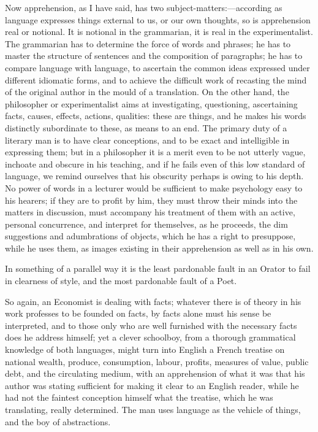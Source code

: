 Now apprehension, as I have said, has two subject-matters:—according
as language expresses things external to us, or our own thoughts, so
is apprehension real or notional. It is notional in the grammarian, it
is real in the experimentalist. The grammarian has to determine the
force of words and phrases; he has to master the structure of
sentences and the composition of paragraphs; he has to compare
language with language, to ascertain the common ideas expressed under
different idiomatic forms, and to achieve the difficult work of
recasting the mind of the original author in the mould of a
translation. On the other hand, the philosopher or experimentalist
aims at investigating, questioning, ascertaining facts, causes,
effects, actions, qualities: these are things, and he makes his words
distinctly subordinate to these, as means to an end. The primary duty
of a literary man is to have clear conceptions, and to be exact
and intelligible in expressing them; but in a philosopher it is a
merit even to be not utterly vague, inchoate and obscure in his
teaching, and if he fails even of this low standard of language, we
remind ourselves that his obscurity perhaps is owing to his depth. No
power of words in a lecturer would be sufficient to make psychology
easy to his hearers; if they are to profit by him, they must throw
their minds into the matters in discussion, must accompany his
treatment of them with an active, personal concurrence, and interpret
for themselves, as he proceeds, the dim suggestions and adumbrations
of objects, which he has a right to presuppose, while he uses them, as
images existing in their apprehension as well as in his own.

In something of a parallel way it is the least pardonable fault in
an Orator to fail in clearness of style, and the most pardonable fault
of a Poet.

So again, an Economist is dealing with facts; whatever there is of
theory in his work professes to be founded on facts, by facts alone
must his sense be interpreted, and to those only who are well
furnished with the necessary facts does he address himself; yet a
clever schoolboy, from a thorough grammatical knowledge of both
languages, might turn into English a French treatise on national
wealth, produce, consumption, labour, profits, measures of value,
public debt, and the circulating medium, with an apprehension of what
it was that his author was stating sufficient for making it clear to
an English reader, while he had not the faintest conception himself
what the treatise, which he was translating, really determined.
The man uses language as the vehicle of things, and the boy of
abstractions.

